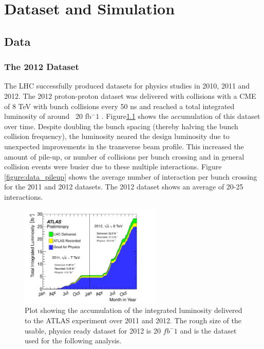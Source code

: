 \chapter[Dataset and Simulation][Dataset and Simulation]{Dataset and Simulation}
\label{chapter:data} 
\section{Data}

\subsection{The 2012 Dataset} 

The LHC successfully produced datasets for physics studies in 2010, 2011 and 2012. The 2012 
proton-proton dataset was delivered with collisions with a CME of 8 TeV with bunch collisions
every 50 ns and reached a total integrated luminosity of around ~20 fb$^-1$ \cite{Aad:2013ucp}.
Figure\ref{figure:data_lumi} shows the accumulation of this dataset over time. 
Despite doubling the bunch spacing (thereby halving the bunch collision frequency), the luminosity neared
the design luminosity due to unexpected improvements in the transverse beam profile\cite{Carli:1424362}. This increased
the amount of pile-up, or number of collisions per bunch crossing and in general collision
events were busier due to these multiple interactions. Figure \ref{figure:data_pileup} shows
the average number of interaction per bunch crossing for the 2011 and 2012 datasets. The 2012
dataset shows an average of 20-25 interactions. 
\begin{figure}[!t]
\centering 
\includegraphics[width=0.60\textwidth]{figs/intlumivstime2011-2012DQ.pdf}
\caption{ Plot showing the accumulation of the integrated luminosity delivered to the ATLAS experiment over 2011 and 2012. The rough size of the usable, physics ready dataset for 2012 is 20 $fb^-1$ and is the dataset used for the following analysis. 
}
\label{figure:data_lumi}
\end{figure}


